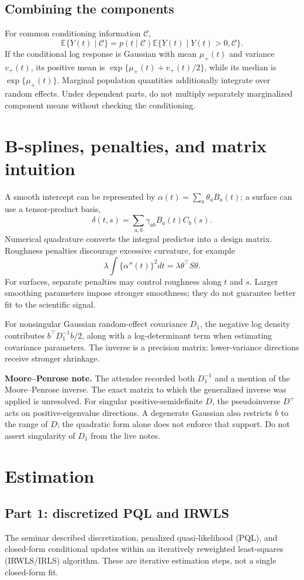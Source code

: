 \documentclass[11pt]{article}
\newcommand{\E}{\mathbb E}\newcommand{\Var}{\operatorname{Var}}\newcommand{\logit}{\operatorname{logit}}
\begin{document}
\subsection{Combining the components}
For common conditioning information $\mathcal C$,
\[
\E\{Y(t)\mid\mathcal C\}=p(t\mid\mathcal C)\E\{Y(t)\mid Y(t)>0,\mathcal C\}.
\]
If the conditional log response is Gaussian with mean $\mu_+(t)$ and variance $v_+(t)$, its positive mean is $\exp\{\mu_+(t)+v_+(t)/2\}$, while its median is $\exp\{\mu_+(t)\}$. Marginal population quantities additionally integrate over random effects. Under dependent parts, do not multiply separately marginalized component means without checking the conditioning.
\section{B-splines, penalties, and matrix intuition}
A smooth intercept can be represented by $\alpha(t)=\sum_a\theta_a B_a(t)$; a surface can use a tensor-product basis,
\[
\delta(t,s)=\sum_{a,b}\gamma_{ab}B_a(t)C_b(s).
\]
Numerical quadrature converts the integral predictor into a design matrix. Roughness penalties discourage excessive curvature, for example
\[
\lambda\int\{\alpha''(t)\}^2dt=\lambda\theta^\top S\theta.
\]
For surfaces, separate penalties may control roughness along $t$ and $s$. Larger smoothing parameters impose stronger smoothness; they do not guarantee better fit to the scientific signal.

For nonsingular Gaussian random-effect covariance $D_1$, the negative log density contributes $b^\top D_1^{-1}b/2$, along with a log-determinant term when estimating covariance parameters. The inverse is a precision matrix: lower-variance directions receive stronger shrinkage.

\textbf{Moore--Penrose note.} The attendee recorded both $D_1^{-1}$ and a mention of the Moore--Penrose inverse. The exact matrix to which the generalized inverse was applied is unresolved. For singular positive-semidefinite $D$, the pseudoinverse $D^+$ acts on positive-eigenvalue directions. A degenerate Gaussian also restricts $b$ to the range of $D$; the quadratic form alone does not enforce that support. Do not assert singularity of $D_1$ from the live notes.
\section{Estimation}
\subsection{Part 1: discretized PQL and IRWLS}
The seminar described discretization, penalized quasi-likelihood (PQL), and closed-form conditional updates within an iteratively reweighted least-squares (IRWLS/IRLS) algorithm. These are iterative estimation steps, not a single closed-form fit.
\end{document}
